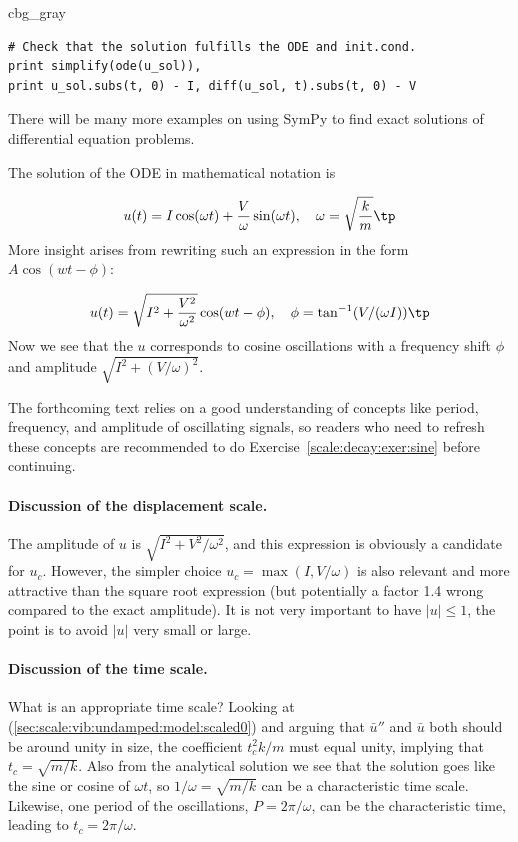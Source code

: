 \documentclass[graybox,envcountchap,sectrefs,final]{svmonodo}
\newenvironment{_cod_tight}[1]{
   \def\FrameCommand{\colorbox{#1}}
   \FrameRule0.6pt\MakeFramed {\FrameRestore}\vskip3mm}
   {\vskip0mm\endMakeFramed}
\newenvironment{cod}[1]{
\bgroup\rmfamily
\fboxsep=0mm\relax
\begin{_cod_tight}{#1}
\list{}{\parsep=-2mm\parskip=0mm\topsep=0pt\leftmargin=2mm
\rightmargin=2\leftmargin\leftmargin=4pt\relax}
\item\relax}
{\endlist\end{_cod_tight}\egroup}
\begin{document}
\begin{cod}{cbg_gray}\begin{Verbatim}[numbers=none,fontsize=\fontsize{9pt}{9pt},baselinestretch=0.95,xleftmargin=2mm]
# Check that the solution fulfills the ODE and init.cond.
print simplify(ode(u_sol)),
print u_sol.subs(t, 0) - I, diff(u_sol, t).subs(t, 0) - V
\end{Verbatim}
\end{cod}
\noindent
There will be many more examples on using SymPy to find exact solutions
of differential equation problems.

The solution of the ODE in mathematical notation is

\[ u(t) = I\cos(\omega t) + \frac{V}{\omega}\sin(\omega t),\quad \omega = \sqrt{\frac{k}{m}}\tp\]
More insight arises from rewriting such an expression in the form
$A\cos(wt - \phi)$:

\[ u(t) = \sqrt{I^2 + \frac{V^2}{\omega^2}}\cos(wt - \phi),\quad
\phi = \tan^{-1}(V/(\omega I))\tp
\]
Now we see that the $u$ corresponds to cosine oscillations with a
frequency shift $\phi$ and amplitude $\sqrt{I^2 + (V/\omega)^2}$.

The forthcoming text relies on a good understanding of concepts
like period, frequency, and amplitude of oscillating signals, so
readers who need to refresh these concepts are recommended to
do Exercise~\ref{scale:decay:exer:sine} before continuing.

\paragraph{Discussion of the displacement scale.}
The amplitude of $u$ is $\sqrt{I^2 + V^2/\omega^2}$, and this
expression is obviously a candidate for $u_c$.  However, the simpler
choice $u_c=\max (I, V/\omega)$ is also relevant and more attractive
than the square root expression (but potentially a factor 1.4 wrong
compared to the exact amplitude).  It is not very important to have
$|u|\leq 1$, the point is to avoid $|u|$ very small or large.

\paragraph{Discussion of the time scale.}
What is an appropriate time scale? Looking at
(\ref{sec:scale:vib:undamped:model:scaled0}) and arguing that
$\bar u''$ and $\bar u$ both should be around unity in size, the
coefficient $t_c^2k/m$ must equal unity, implying that $t_c=\sqrt{m/k}$.
Also from the analytical solution we see that the solution goes like the
sine or cosine of $\omega t$, so $1/\omega = \sqrt{m/k}$ can be a characteristic
time scale. Likewise, one period of the oscillations, $P=2\pi/\omega$, can
be the characteristic time, leading to $t_c=2\pi/\omega$.
\end{document}
